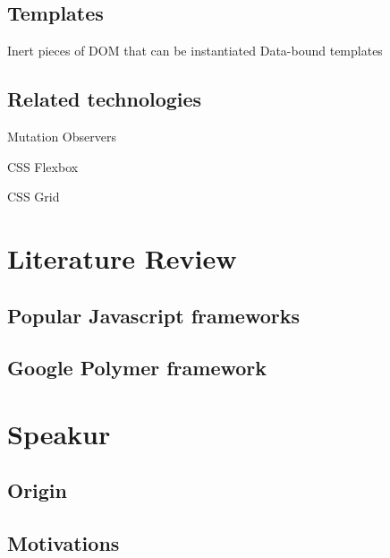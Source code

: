 \subsection{Templates}
Inert pieces of DOM that can be instantiated
Data-bound templates

\subsection{Related technologies}

Mutation Observers

CSS Flexbox

CSS Grid



\section{Literature Review}
\subsection{Popular Javascript frameworks}
\subsection{Google Polymer framework}

\section{Speakur}
\subsection{Origin}
\subsection{Motivations}

